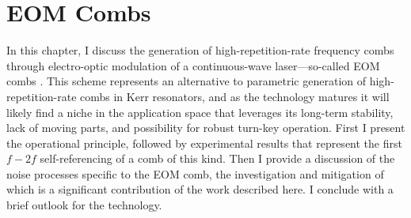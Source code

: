  \chapter{EOM Combs}

In this chapter, I discuss the generation of high-repetition-rate frequency combs through electro-optic modulation of a continuous-wave laser---so-called EOM combs \cite{Kobayashi1972,Kourogi1993,Murata2000,Sakamoto2007,Morohashi2008,Ishizawa2010,Wu2010,Supradeepa2012,Metcalf2013,Wu2013}. This scheme represents an alternative to parametric generation of high-repetition-rate combs in Kerr resonators, and as the technology matures it will likely find a niche in the application space that leverages its long-term stability, lack of moving parts, and possibility for robust turn-key operation. First I present the operational principle, followed by experimental results that represent the first $f-2f$ self-referencing of a comb of this kind. Then I provide a discussion of the noise processes specific to the EOM comb, the investigation and mitigation of which is a significant contribution of the work described here. I conclude with a brief outlook for the technology.

